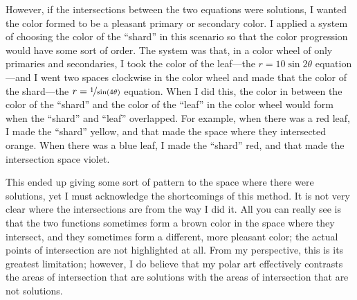 However, if the intersections between the two equations were solutions, I wanted the color formed to be a pleasant primary or secondary color. I applied a system of choosing the color of the ``shard'' in this scenario so that the color progression would have some sort of order. The system was that, in a color wheel of only primaries and secondaries, I took the color of the leaf---the $r = 10\sin{2\theta}$ equation---and I went two spaces clockwise in the color wheel and made that the color of the shard---the $r = \nicefrac{1}{\sin(4\theta)}$ equation. When I did this, the color in between the color of the ``shard'' and the color of the ``leaf'' in the color wheel would form when the ``shard'' and ``leaf'' overlapped. For example, when there was a red leaf, I made the ``shard'' yellow, and that made the space where they intersected orange. When there was a blue leaf, I made the ``shard'' red, and that made the intersection space violet.

This ended up giving some sort of pattern to the space where there were solutions, yet I must acknowledge the shortcomings of this method. It is not very clear where the intersections are from the way I did it. All you can really see is that the two functions sometimes form a brown color in the space where they intersect, and they sometimes form a different, more pleasant color; the actual points of intersection are not highlighted at all. From my perspective, this is its greatest limitation; however, I do believe that my polar art effectively contrasts the areas of intersection that are solutions with the areas of intersection that are not solutions.
